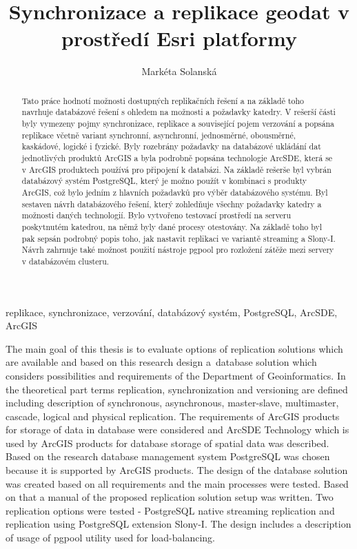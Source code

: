\documentclass{llncs}
\title{Synchronizace a replikace geodat v prostředí Esri platformy}
\author{Markéta Solanská}
\institute{Katedra geoinformatiky, Přírodovědecká fakulta, Univerzita Palackého v Olomouci, 17. listopadu 50, 779 00 Olomouc, Česká republika, \\
\email{marketa.solanska@gmail.com}}
\begin{document}
\maketitle

\begin{abstract}
  Tato práce hodnotí možnosti dostupných replikačních řešení a na základě toho
  navrhuje databázové řešení s ohledem na možnosti a požadavky katedry. V
  rešerší části byly vymezeny pojmy synchronizace, replikace a související
  pojem verzování a popsána replikace včetně variant synchronní, asynchronní,
  jednosměrné, obousměrné, kaskádové, logické i fyzické. Byly rozebrány
  požadavky na databázové ukládání dat jednotlivých produktů ArcGIS a byla
  podrobně popsána technologie ArcSDE, která se v ArcGIS produktech používá pro
  připojení k databázi. Na základě rešerše byl vybrán databázový systém
  PostgreSQL, který je možno použít v kombinaci s produkty ArcGIS, což bylo
  jedním z hlavních požadavků pro výběr databázového systému. Byl sestaven
  návrh databázového řešení, který zohledňuje všechny požadavky katedry a
  možnosti daných technologií. Bylo vytvořeno testovací prostředí na serveru
  poskytnutém katedrou, na němž byly dané procesy otestovány. Na základě toho
  byl pak sepsán podrobný popis toho, jak nastavit replikaci ve variantě
  streaming a Slony-I. Návrh zahrnuje také možnost použití nástroje pgpool pro
  rozložení zátěže mezi servery v databázovém clusteru.
\end{abstract}


\begin{keywords}
  replikace, synchronizace, verzování, databázový systém, Po\-stgreSQL, ArcSDE, ArcGIS
\end{keywords}

\begin{abstractEnglish}
  The main goal of this thesis is to evaluate options of replication solutions
  which are available and based on this research design a~database solution
  which considers possibilities and requirements of the Department of
  Geoinformatics. In the theoretical part terms replication, synchronization
  and versioning are defined including description of synchronous,
  asynchronous, master-slave, multimaster, cascade, logical and physical
  replication. The requirements of ArcGIS products for storage of data in
  database were considered and ArcSDE Technology which is used by ArcGIS
  products for database storage of spatial data was described. Based on the
  research database management system PostgreSQL was chosen because it is
  supported by ArcGIS products. The design of the database solution was created
  based on all requirements and the main processes were tested. Based on that a
  manual of the proposed replication solution setup was written. Two
  replication options were tested - PostgreSQL native streaming replication and
  replication using PostgreSQL extension Slony-I. The design includes a
  description of usage of pgpool utility used for load-balancing. 
\end{abstractEnglish}
\end{document}
